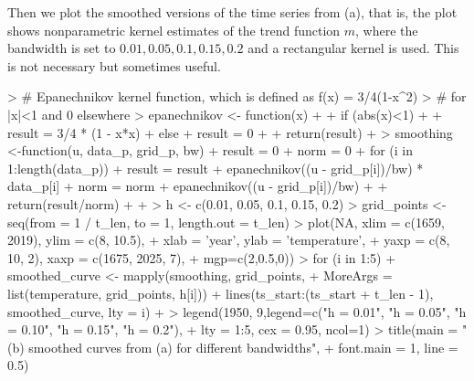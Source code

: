 \documentclass[a4paper]{scrartcl}
\begin{document}
Then we plot the smoothed versions of the time series from (a), that is, the plot shows nonparametric kernel estimates of the trend function $m$, where the bandwidth is set to $0.01, 0.05, 0.1, 0.15, 0.2$ and a rectangular kernel is used. This is not necessary but sometimes useful.
\begin{Schunk}
\begin{Sinput}
> # Epanechnikov kernel function, which is defined as f(x) = 3/4(1-x^2)
> # for |x|<1 and 0 elsewhere
> epanechnikov <- function(x)
+ {
+   if (abs(x)<1)
+   {
+     result = 3/4 * (1 - x*x)
+   } else {
+     result = 0
+   }
+   return(result)
+ }
> smoothing <-function(u, data_p, grid_p, bw){
+   result = 0
+   norm = 0
+   for (i in 1:length(data_p)){
+     result = result + epanechnikov((u - grid_p[i])/bw) * data_p[i]
+     norm = norm + epanechnikov((u - grid_p[i])/bw) 
+   }
+   return(result/norm)
+ 
+ }
> h <- c(0.01, 0.05, 0.1, 0.15, 0.2)
> grid_points <- seq(from = 1 / t_len, to = 1, length.out = t_len)
> plot(NA, xlim = c(1659, 2019), ylim = c(8, 10.5),
+      xlab = 'year', ylab = 'temperature',
+      yaxp  = c(8, 10, 2), xaxp = c(1675, 2025, 7),
+      mgp=c(2,0.5,0))
> for (i in 1:5){
+     smoothed_curve <- mapply(smoothing, grid_points,
+                              MoreArgs = list(temperature, grid_points, h[i]))
+     lines(ts_start:(ts_start + t_len - 1), smoothed_curve, lty = i) 
+   }
> legend(1950, 9,legend=c("h = 0.01", "h = 0.05", "h = 0.10", "h = 0.15", "h = 0.2"),
+        lty = 1:5, cex = 0.95, ncol=1)
> title(main = "(b) smoothed curves from (a) for different bandwidths",
+       font.main = 1, line = 0.5)
\end{Sinput}
\end{Schunk}
\end{document}
